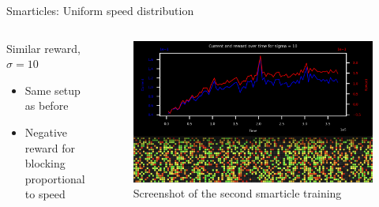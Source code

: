 \documentclass[10pt,xcolor=table, aspectratio=1610]{beamer}
\begin{document}
\begin{frame}{Smarticles: Uniform speed distribution}
  \begin{columns}
    \begin{block}{Similar reward, $\sigma=10$}
      \begin{itemize}
        \item Same setup as before
        \item Negative reward for blocking proportional to speed
      \end{itemize}
    \end{block}
    \begin{figure}
        \includegraphics[width=\textwidth]{../Thesis/img/results/second_training_screenshot.png}
        \caption*{Screenshot of the second smarticle training}
      \end{figure}
  \end{columns}
\end{frame}
\end{document}
